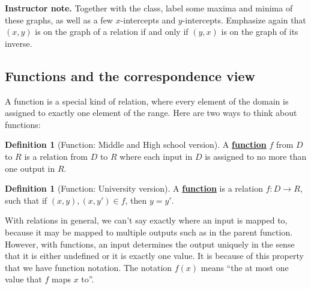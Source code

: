 \documentclass[11pt]{article}
\newcommand\smallnote[1]
	{\begin{mdframed}\raggedright  {\bf Instructor note.} {#1} \end{mdframed}}
\renewcommand\emph[1]{\underline{\bf{#1}}} %
\theoremstyle{definition}
\newtheorem{definition}[theorem]{Definition}
\begin{document}
\smallnote{Together with the class, label some maxima and minima of these graphs, as well as a few $x$-intercepts and $y$-intercepts. Emphasize again that $(x,y)$ is on the graph of a relation if and only if $(y,x)$ is on the graph of its inverse.}

\newpage

\subsection{Functions and the correspondence view}


A function is a special kind of relation, where every element of the domain is assigned to exactly one element of the range. Here are two ways to think about functions:

\begin{definition}[Function: Middle and High school version]\label{d: function middle high school}
A \emph{function} $f$ from $D$ to $R$ is a relation from $D$ to $R$ where each input in $D$ is assigned to no more than one output in $R$.
\end{definition} 
 
\begin{definition}[Function: University version]\label{d: function university} 
A \emph{function} is a relation $f: D \to R$, such that if $(x,y), (x, y')\in f$, then $y=y'$.
\end{definition}

With relations in general, we can't say exactly where an input is mapped to, because it may be mapped to multiple outputs such as in the parent function. However, with functions, an input determines the output uniquely in the sense that it is either undefined or it is exactly one value. It is because of this property that we have function notation. The notation $f(x)$ means ``the at most one value that $f$ maps $x$ to''.
\end{document}
